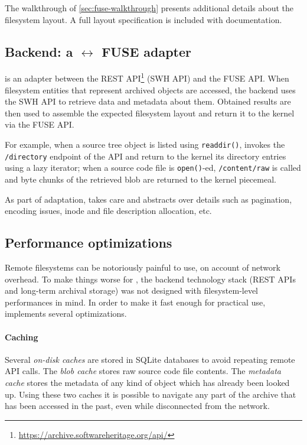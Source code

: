 The walkthrough of \cref{sec:fuse-walkthrough} presents additional details
about the \SWHFS{} filesystem layout. A full layout specification is included
with \SWHFS{} documentation.


\subsection{Backend: a \SWH{} $\leftrightarrow$ FUSE adapter}

\SWHFSpy{} is an adapter between the \SWH{} REST
API\footnote{\url{https://archive.softwareheritage.org/api/}} (SWH API) and the
FUSE API\@. When filesystem entities that represent archived objects are
accessed, the \SWHFSpy{} backend uses the SWH API to retrieve data and metadata
about them.  Obtained results are then used to assemble the expected filesystem
layout and return it to the kernel via the FUSE API\@.

For example, when a source tree object is listed using
\texttt{readdir()}, \SWHFS{} invokes the \texttt{/directory} endpoint of
the \SWH{} API and return to the kernel its directory entries using a lazy
iterator; when a source code file is \texttt{open()}-ed,
\texttt{/content/raw} is called and byte chunks of the retrieved blob are
returned to the kernel piecemeal.

As part of adaptation, \SWHFSpy{} takes care and abstracts over details such as
pagination, encoding issues, inode and file description allocation, etc.


\subsection{Performance optimizations}

Remote filesystems can be notoriously painful to use, on account of network
overhead.  To make things worse for \SWHFS, the backend technology stack (REST
APIs and long-term archival storage) was not designed with filesystem-level
performances in mind. In order to make it fast enough for practical use,
\SWHFS{} implements several optimizations.


\paragraph*{Caching}

Several \emph{on-disk caches} are stored in SQLite databases to avoid repeating
remote API calls.
The \emph{blob cache} stores raw source code file contents. The \emph{metadata
  cache} stores the metadata of any kind of object which has already been
  looked up. Using these two caches it is possible to navigate any part of the
  \SWH{} archive that has been accessed in the past, even while disconnected
  from the network.


